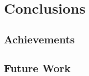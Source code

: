 \chapter{Conclusions}
\label{chapter:conclusions}

\section{Achievements}
\label{section:achievements}



\section{Future Work}
\label{section:future}
